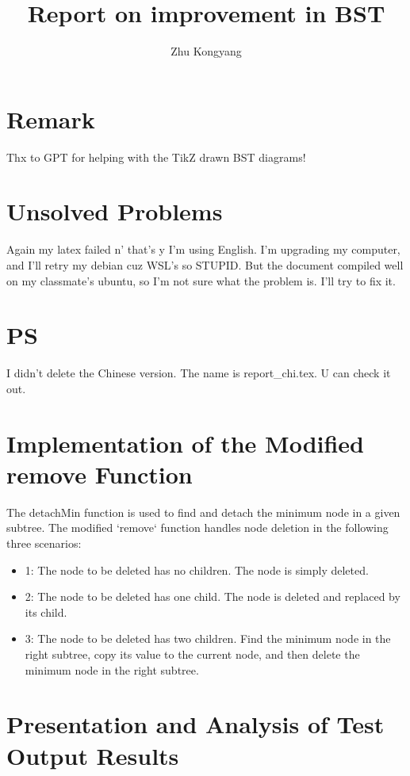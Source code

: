 \documentclass[12pt]{article}
\begin{document}
\title{Report on improvement in BST}
\author{Zhu Kongyang}
\maketitle

\section{Remark}
Thx to GPT for helping with the TikZ drawn BST diagrams!

\section{Unsolved Problems}
Again my latex failed n' that's y I'm using English. I'm upgrading my computer, and I'll retry my debian cuz WSL's so STUPID. But the document compiled well on my classmate's ubuntu, so I'm not sure what the problem is. I'll try to fix it.

\section{PS}
I didn't delete the Chinese version. The name is report\_chi.tex. U can check it out.

\section{Implementation of the Modified remove Function}
The detachMin function is used to find and detach the minimum node in a given subtree. The modified `remove` function handles node deletion in the following three scenarios:

\begin{itemize}
  \item 1: The node to be deleted has no children. The node is simply deleted.
  \item 2: The node to be deleted has one child. The node is deleted and replaced by its child.
  \item 3: The node to be deleted has two children. Find the minimum node in the right subtree, copy its value to the current node, and then delete the minimum node in the right subtree.
\end{itemize}

\section{Presentation and Analysis of Test Output Results}
\end{document}
